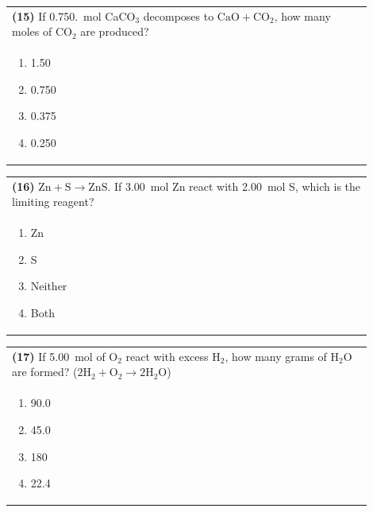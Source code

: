 \documentclass{article}
\begin{document}
\vspace{0.2cm}
\noindent\begin{tabular}{|p{0.9\linewidth}|}
\hline
\textbf{(15)} If 0.750.~mol CaCO$_3$ decomposes to $\text{CaO} + \text{CO}_2$, how many moles of CO$_2$ are produced?\\[0.2cm]

\begin{minipage}[t]{0.85\linewidth}
\begin{enumerate}[label=\alph*.]
\item 1.50
\item 0.750
\item 0.375
\item 0.250
\end{enumerate}
\end{minipage}\\[0.2cm]
\hline
\end{tabular}

\vspace{0.2cm}
\noindent\begin{tabular}{|p{0.9\linewidth}|}
\hline
\textbf{(16)} $\text{Zn} + \text{S} \rightarrow \text{ZnS}$. If 3.00~mol Zn react with 2.00~mol S, which is the limiting reagent?\\[0.2cm]

\begin{minipage}[t]{0.85\linewidth}
\begin{enumerate}[label=\alph*.]
\item Zn
\item S
\item Neither
\item Both
\end{enumerate}
\end{minipage}\\[0.2cm]
\hline
\end{tabular}

\newpage

\noindent\begin{tabular}{|p{0.9\linewidth}|}
\hline
\textbf{(17)} If 5.00~mol of O$_2$ react with excess H$_2$, how many grams of H$_2$O are formed? ($2\text{H}_2 + \text{O}_2 \rightarrow 2\text{H}_2\text{O}$)\\[0.2cm]

\begin{minipage}[t]{0.85\linewidth}
\begin{enumerate}[label=\alph*.]
\item 90.0
\item 45.0
\item 180
\item 22.4
\end{enumerate}
\end{minipage}\\[0.2cm]
\hline
\end{tabular}
\end{document}

